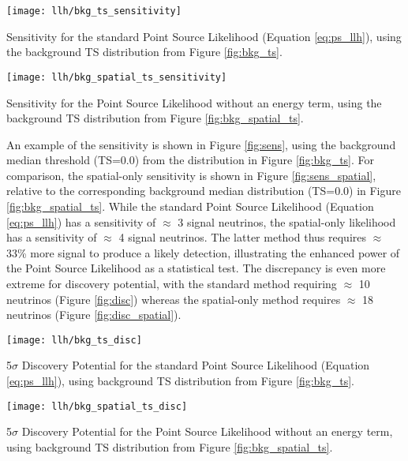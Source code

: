 \begin{marginfigure}
	\centering \texttt{[image: llh/bkg\_ts\_sensitivity]}
	\caption{Sensitivity for the standard Point Source Likelihood (Equation \ref{eq:ps_llh}),  using the background TS distribution from Figure \ref{fig:bkg_ts}.}
	\label{fig:sens}
\end{marginfigure}

\begin{marginfigure}
	\centering \texttt{[image: llh/bkg\_spatial\_ts\_sensitivity]}
	\caption{Sensitivity for the Point Source Likelihood without an energy term, using the background TS distribution from Figure \ref{fig:bkg_spatial_ts}.}
	\label{fig:sens_spatial}
\end{marginfigure}

An example of the sensitivity is shown in Figure \ref{fig:sens}, using the background median threshold (TS=0.0)  from the distribution in Figure \ref{fig:bkg_ts}. For comparison, the spatial-only sensitivity is shown in Figure \ref{fig:sens_spatial}, relative to the corresponding background median distribution (TS=0.0) in Figure \ref{fig:bkg_spatial_ts}. While the standard Point Source Likelihood (Equation \ref{eq:ps_llh}) has a sensitivity of $\approx$ 3 signal neutrinos, the spatial-only likelihood has a sensitivity of $\approx$ 4 signal neutrinos. The latter method thus requires $\approx$ 33\% more signal to produce a likely detection, illustrating the enhanced power of the Point Source Likelihood as a statistical test. The discrepancy is even more extreme for discovery potential, with the standard method requiring $\approx$ 10 neutrinos (Figure \ref{fig:disc}) whereas the spatial-only method requires $\approx$ 18 neutrinos (Figure \ref{fig:disc_spatial}).

\begin{marginfigure}
	\centering \texttt{[image: llh/bkg\_ts\_disc]}
	\caption{5$\sigma$ Discovery Potential for the standard Point Source Likelihood (Equation \ref{eq:ps_llh}), using background TS distribution from Figure \ref{fig:bkg_ts}.}
	\label{fig:disc}
\end{marginfigure}

\begin{marginfigure}
	\centering \texttt{[image: llh/bkg\_spatial\_ts\_disc]}
	\caption{5$\sigma$ Discovery Potential for the Point Source Likelihood without an energy term, using background TS distribution from Figure \ref{fig:bkg_spatial_ts}.}
	\label{fig:disc_spatial}
\end{marginfigure}

